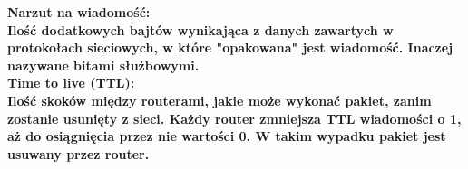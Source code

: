 \documentclass[a4paper,12pt]{article}
\newcommand{\h}[1]{\noindent \bf #1 \rm \\ \noindent}
\begin{document}
\h{Narzut na wiadomość:}
Ilość dodatkowych bajtów wynikająca z danych zawartych w protokołach sieciowych, w które "opakowana" jest wiadomość. Inaczej nazywane bitami służbowymi.\\

\h{Time to live (TTL):}
Ilość skoków między routerami, jakie może wykonać pakiet, zanim zostanie usunięty z sieci. Każdy router zmniejsza TTL wiadomości o 1, aż do osiągnięcia przez nie wartości 0. W takim wypadku pakiet jest usuwany przez router.
\end{document}

